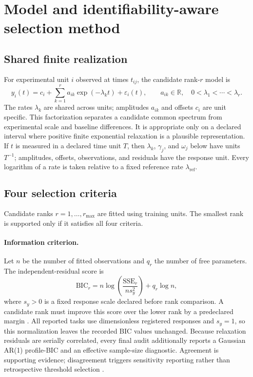 \documentclass[11pt]{article}
\begin{document}
\section{Model and identifiability-aware selection method}
\subsection{Shared finite realization}
For experimental unit $i$ observed at times $t_{ij}$, the candidate rank-$r$ model is
\begin{equation}
y_i(t)=c_i+\sum_{k=1}^{r}a_{ik}\exp(-\lambda_k t)+\varepsilon_i(t),
\qquad a_{ik}\in\mathbb R,\quad 0<\lambda_1<\cdots<\lambda_r.
\label{eq:model}
\end{equation}
The rates $\lambda_k$ are shared across units; amplitudes $a_{ik}$ and offsets $c_i$ are unit specific. This factorization separates a candidate common spectrum from experimental scale and baseline differences. It is appropriate only on a declared interval where positive finite exponential relaxation is a plausible representation.
If $t$ is measured in a declared time unit $T$, then $\lambda_k$, $\gamma_j$, and $\omega_j$ below have units $T^{-1}$; amplitudes, offsets, observations, and residuals have the response unit. Every logarithm of a rate is taken relative to a fixed reference rate $\lambda_{\mathrm{ref}}$.

\subsection{Four selection criteria}
Candidate ranks $r=1,\ldots,r_{\max}$ are fitted using training units. The smallest rank is supported only if it satisfies all four criteria.

\paragraph{Information criterion.} Let $n$ be the number of fitted observations and $q_r$ the number of free parameters. The independent-residual score is
\begin{equation}
\mathrm{BIC}_r=n\log\!\left(\frac{\mathrm{SSE}_r}{n s_y^2}\right)+q_r\log n,
\end{equation}
where $s_y>0$ is a fixed response scale declared before rank comparison. A candidate rank must improve this score over the lower rank by a predeclared margin \cite{schwarz1978bic}. All reported tasks use dimensionless registered responses and $s_y=1$, so this normalization leaves the recorded BIC values unchanged. Because relaxation residuals are serially correlated, every final audit additionally reports a Gaussian AR(1) profile-BIC and an effective sample-size diagnostic. Agreement is supporting evidence; disagreement triggers sensitivity reporting rather than retrospective threshold selection \cite{hurvich1989timeseries}.
\end{document}
